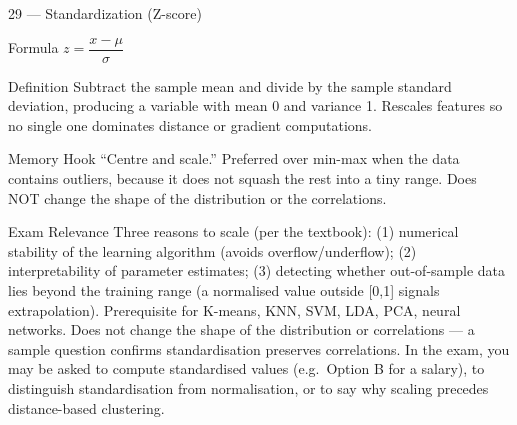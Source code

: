 \documentclass[aspectratio=169,8pt]{beamer}
\begin{document}
	\begin{frame}{29 --- Standardization (Z-score)}
		\begin{block}{Formula}
			$z = \dfrac{x - \mu}{\sigma}$
		\end{block}
		\begin{block}{Definition}
			Subtract the sample mean and divide by the sample standard deviation, producing a variable with mean 0 and variance 1. Rescales features so no single one dominates distance or gradient computations.
		\end{block}
		\begin{block}{Memory Hook}
			``Centre and scale.'' Preferred over min-max when the data contains outliers, because it does not squash the rest into a tiny range. Does NOT change the shape of the distribution or the correlations.
		\end{block}
		\begin{block}{Exam Relevance}
			Three reasons to scale (per the textbook): (1) numerical stability of the learning algorithm (avoids overflow/underflow); (2) interpretability of parameter estimates; (3) detecting whether out-of-sample data lies beyond the training range (a normalised value outside [0,1] signals extrapolation). Prerequisite for K-means, KNN, SVM, LDA, PCA, neural networks. Does not change the shape of the distribution or correlations --- a sample question confirms standardisation preserves correlations. In the exam, you may be asked to compute standardised values (e.g.\ Option B for a salary), to distinguish standardisation from normalisation, or to say why scaling precedes distance-based clustering.
		\end{block}
	\end{frame}
	
\end{document}
